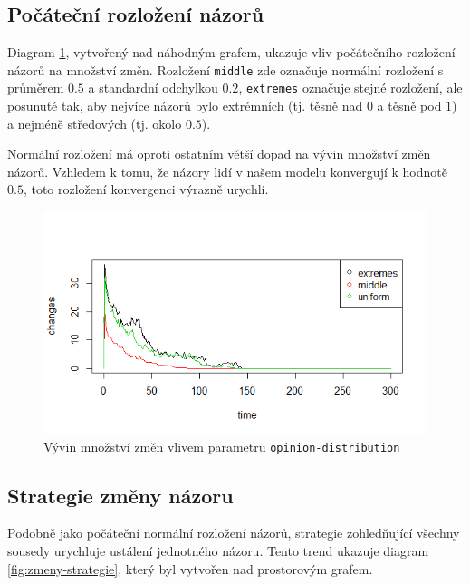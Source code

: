 \documentclass[10pt,a4paper]{report}
\begin{document}
\subsection{Počáteční rozložení názorů}
Diagram \ref{fig:zmeny-rozlozeni}, vytvořený nad náhodným grafem, ukazuje vliv počátečního rozložení názorů na množství změn. Rozložení \texttt{middle} zde označuje normální rozložení s průměrem $0.5$ a standardní odchylkou $0.2$, \texttt{extremes} označuje stejné rozložení, ale posunuté tak, aby nejvíce názorů bylo extrémních (tj. těsně nad $0$ a těsně pod $1$) a nejméně středových (tj. okolo $0.5$). 

Normální rozložení má oproti ostatním větší dopad na vývin množství změn názorů. Vzhledem k tomu, že názory lidí v našem modelu konvergují k hodnotě $0.5$, toto rozložení konvergenci výrazně urychlí.

\begin{figure}[h]
  \includegraphics[width=\textwidth]{plots/small-world-g/smallWorldDistribution.png}
  \caption{Vývin množství změn vlivem parametru \texttt{opinion-distribution}}
  \label{fig:zmeny-rozlozeni}
\end{figure}

\subsection{Strategie změny názoru}
Podobně jako počáteční normální rozložení názorů, strategie zohledňující všechny sousedy urychluje ustálení jednotného názoru. Tento trend ukazuje diagram \ref{fig:zmeny-strategie}, který byl vytvořen nad prostorovým grafem.
\end{document}
